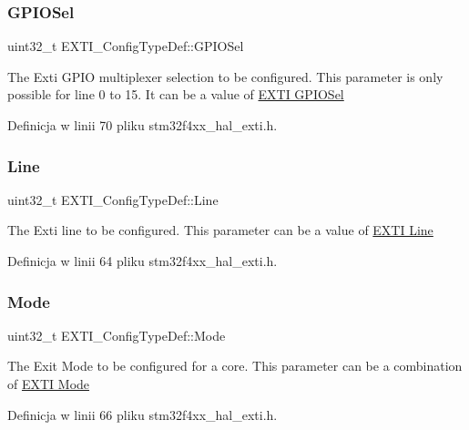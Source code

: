 \subsubsection{\texorpdfstring{G\+P\+I\+O\+Sel}{GPIOSel}}
{\footnotesize\ttfamily uint32\+\_\+t E\+X\+T\+I\+\_\+\+Config\+Type\+Def\+::\+G\+P\+I\+O\+Sel}

The Exti G\+P\+IO multiplexer selection to be configured. This parameter is only possible for line 0 to 15. It can be a value of \hyperlink{group___e_x_t_i___g_p_i_o_sel}{E\+X\+TI G\+P\+I\+O\+Sel} 

Definicja w linii 70 pliku stm32f4xx\+\_\+hal\+\_\+exti.\+h.

\mbox{\label{struct_e_x_t_i___config_type_def_a19ad88703f9ac13e8a741afdba86f6af}} 
\subsubsection{\texorpdfstring{Line}{Line}}
{\footnotesize\ttfamily uint32\+\_\+t E\+X\+T\+I\+\_\+\+Config\+Type\+Def\+::\+Line}

The Exti line to be configured. This parameter can be a value of \hyperlink{group___e_x_t_i___line}{E\+X\+TI Line} 

Definicja w linii 64 pliku stm32f4xx\+\_\+hal\+\_\+exti.\+h.

\mbox{\label{struct_e_x_t_i___config_type_def_a6393a89a8cd198b19e10876e6f12cf5b}} 
\subsubsection{\texorpdfstring{Mode}{Mode}}
{\footnotesize\ttfamily uint32\+\_\+t E\+X\+T\+I\+\_\+\+Config\+Type\+Def\+::\+Mode}

The Exit Mode to be configured for a core. This parameter can be a combination of \hyperlink{group___e_x_t_i___mode}{E\+X\+TI Mode} 

Definicja w linii 66 pliku stm32f4xx\+\_\+hal\+\_\+exti.\+h.

\mbox{\label{struct_e_x_t_i___config_type_def_acf6d2ea84df5f2b705676584ae00707a}} 
